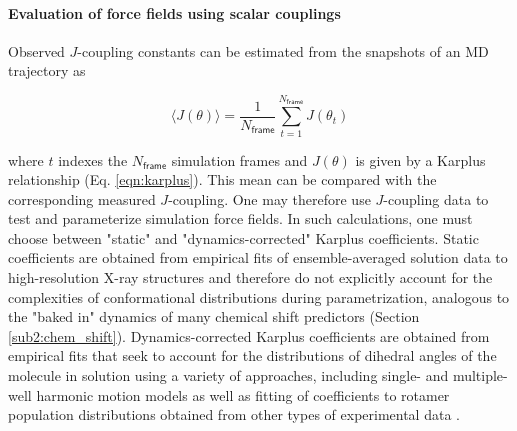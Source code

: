 \documentclass[9pt,review]{livecoms}
\begin{document}
\paragraph{Evaluation of force fields using scalar couplings}

Observed $J$-coupling constants can be estimated from the snapshots of an MD trajectory as

\begin{equation}
\label{eqn:j_coupling_estimate}
\langle J(\theta) \rangle = \frac {1} {N_\mathsf{frame}} \sum_{t=1}^{N_{\mathsf{frame}}} J(\theta_t)
\end{equation}

\noindent where $t$ indexes the $N_{\mathsf{frame}}$ simulation frames and $J(\theta)$ is given by a Karplus relationship (Eq. \ref{eqn:karplus}).
This mean can be compared with the corresponding measured $J$-coupling.
One may therefore use $J$-coupling data to test \cite{graf_structure_2007,best_are_2008,lindorff2012systematic,beauchamp_are_2012,Maier:2015:J.Chem.TheoryComput.} and parameterize \cite{best_optimized_2009,piana_how_2011,best_optimization_2012,best_balanced_2014,Maier:2015:J.Chem.TheoryComput.,robustelli_developing_2018} simulation force fields.
In such calculations, one must choose between "static" and "dynamics-corrected" Karplus coefficients.
Static coefficients are obtained from empirical fits of ensemble-averaged solution data to high-resolution X-ray structures and therefore do not explicitly account for the complexities of conformational distributions during parametrization, analogous to the "baked in" dynamics of many chemical shift predictors (Section \ref{sub2:chem_shift}).
Dynamics-corrected Karplus coefficients are obtained from empirical fits that seek to account for the distributions of dihedral angles of the molecule in solution using a variety of approaches, including single- and multiple-well harmonic motion models as well as fitting of coefficients to rotamer population distributions obtained from other types of experimental data \cite{brueschweiler_adding_1994,case_static_2000,chou_insights_2003,lindorff-larsen_interpreting_2005,vogeli_limits_2007,lee_quantitative_2015}.
\end{document}
